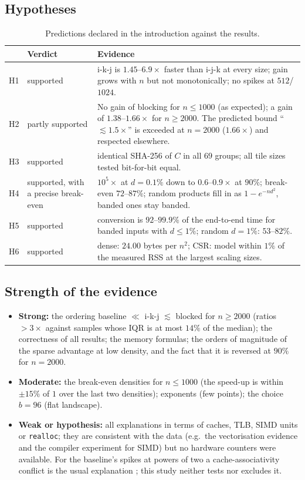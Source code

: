 \subsection{Hypotheses}
\begin{table}[H]
\centering\small
\begin{tabular}{@{}p{0.6cm}p{3.1cm}p{10.2cm}@{}}
\toprule
 & Verdict & Evidence \\
\midrule
H1 & supported & i-k-j is $1.45$--$6.9\times$ faster than i-j-k at every size; gain grows with $n$ but not monotonically; no spikes at $512$/$1024$. \\
H2 & partly supported & No gain of blocking for $n\le1000$ (as expected); a gain of $1.38$--$1.66\times$ for $n\ge2000$. The predicted bound ``$\lesssim1.5\times$'' is exceeded at $n=2000$ ($1.66\times$) and respected elsewhere. \\
H3 & supported & identical SHA-256 of $C$ in all $69$ groups; all tile sizes tested bit-for-bit equal. \\
H4 & supported, with a precise break-even & $10^5\times$ at $d=0.1\%$ down to $0.6$--$0.9\times$ at $90\%$; break-even $72$--$87\%$; random products fill in as $1-e^{-nd^2}$, banded ones stay banded. \\
H5 & supported & conversion is $92$--$99.9\%$ of the end-to-end time for banded inputs with $d\le1\%$; random $d=1\%$: $53$--$82\%$. \\
H6 & supported & dense: $24.00$ bytes per $n^2$; CSR: model within $1\%$ of the measured RSS at the largest scaling sizes. \\
\bottomrule
\end{tabular}
\caption{Predictions declared in the introduction against the results.}
\end{table}

\subsection{Strength of the evidence}
\begin{itemize}
  \item \textbf{Strong:} the ordering baseline $\ll$ i-k-j $\lesssim$ blocked for $n\ge2000$ (ratios $>3\times$ against samples whose IQR is at most $14\%$ of the median); the correctness of all results; the memory formulas; the orders of magnitude of the sparse advantage at low density, and the fact that it is reversed at $90\%$ for $n=2000$.
  \item \textbf{Moderate:} the break-even densities for $n\le1000$ (the speed-up is within $\pm15\%$ of $1$ over the last two densities); exponents (few points); the choice $b=96$ (flat landscape).
  \item \textbf{Weak or hypothesis:} all explanations in terms of caches, TLB, SIMD units or \texttt{realloc}; they are consistent with the data (e.g.\ the vectorisation evidence and the compiler experiment for SIMD) but no hardware counters were available. For the baseline's spikes at powers of two a cache-associativity conflict is the usual explanation \cite{drepper,hennessy}; this study neither tests nor excludes it.
\end{itemize}

